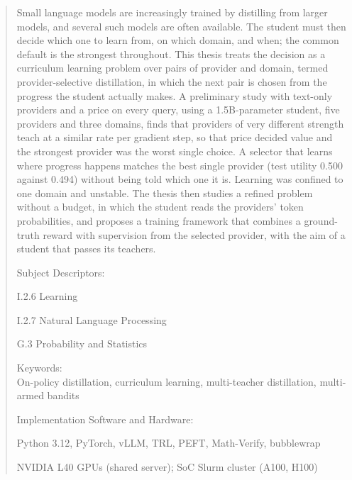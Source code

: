 \begin{abstract}
\noindent
Small language models are increasingly trained by distilling from larger models, and
several such models are often available. The student must then decide which one to learn
from, on which domain, and when; the common default is the strongest throughout. This
thesis treats the decision as a curriculum learning problem over pairs of provider and
domain, termed provider-selective distillation, in which the next pair is chosen from the
progress the student actually makes. A preliminary study with text-only providers and a
price on every query, using a 1.5B-parameter student, five providers and three domains,
finds that providers of very different strength teach at a similar
rate per gradient step, so that price decided value and the strongest provider was the
worst single choice. A selector that learns where progress happens matches the best single
provider (test utility 0.500 against 0.494) without being told which one it is. Learning
was confined to one domain and unstable. The thesis then studies a refined
problem without a budget, in which the student reads the providers' token probabilities,
and proposes a training framework that combines a ground-truth reward with supervision
from the selected provider, with the aim of a student that passes its teachers.

\vspace{5mm}
Subject Descriptors:
\begin{list}{\quad}{}
    \item I.2.6 Learning
    \item I.2.7 Natural Language Processing
    \item G.3 Probability and Statistics
\end{list}

Keywords: \\
\tab On-policy distillation, curriculum learning, multi-teacher distillation,
multi-armed bandits

Implementation Software and Hardware:
\begin{list}{\quad}{}
    \item Python 3.12, PyTorch, vLLM, TRL, PEFT, Math-Verify, bubblewrap
    \item NVIDIA L40 GPUs (shared server); SoC Slurm cluster (A100, H100)
\end{list}
\end{abstract}
\pagebreak
